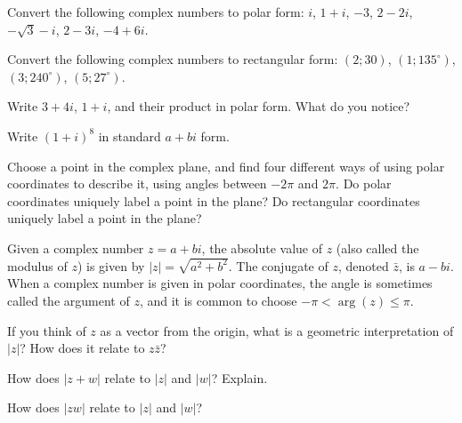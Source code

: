 \documentclass[space,nooutcomes]{ximera}
\begin{document}
\begin{problem}
Convert the following complex numbers to polar form: $i$, $1 + i$,  $-3$, $2 - 2i$, $-\sqrt{3}-i$, $2 - 3i$, $-4 + 6i$.  
\vfill 
\end{problem}

\begin{problem}
Convert the following complex numbers to rectangular form: $(2; 30)$, $(1; 135^\circ)$, 
$(3; 240^\circ)$, $(5; 27^\circ)$.  
\vfill 
\end{problem}

\newpage 

\begin{problem}
Write $3 + 4i$, $1 + i$, and their product in polar form.  What do you notice?  
\vfill 
\end{problem}

\begin{problem}
Write $(1 + i)^8$ in standard $a + bi$ form.  
\vfill 
\end{problem}

\begin{problem}
Choose a point in the complex plane, and find four different ways of using polar coordinates to describe it, using angles between $-2\pi$ and $2\pi$.  
Do polar coordinates uniquely label a point in the plane?
Do rectangular coordinates uniquely label a point in the plane?
\vfill 
\end{problem}

\newpage 


Given a complex number $z=a+bi$, the absolute value of $z$ (also called the modulus of $z$) is given by $|z|=\sqrt{a^2+b^2}$.  The conjugate of $z$, denoted $\bar{z}$, is $a-bi$.  When a complex number is given in polar coordinates, the angle is sometimes called the argument of $z$, and it is common to choose $-\pi<\arg(z)\le \pi$.  

\begin{problem}
If you think of $z$ as a vector from the origin, what is a geometric interpretation of $|z|$?  How does it relate to $z\bar{z}$?  
\vfill 
\end{problem}

\begin{problem}
How does $|z+w|$ relate to $|z|$ and $|w|$?  Explain.  
\vfill 
\end{problem}

\begin{problem}
How does $|zw|$ relate to $|z|$ and $|w|$?  
\vfill 
\end{problem}
\end{document}
